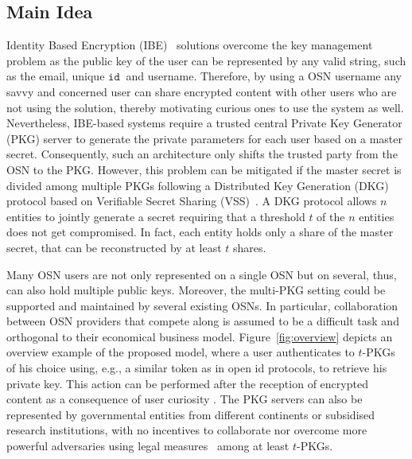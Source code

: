 \documentclass[journal]{IEEEtran}
\newcommand{\figref}[1]{{Figure}~\ref{#1}}
\newcommand{\id}[1]{\ensuremath{\mathtt{id}_{#1}}}
\begin{document}
\subsection{Main Idea}

Identity Based Encryption (IBE)~\cite{DBLP:conf/crypto/Shamir84} solutions overcome the key management problem as the public key of the user can be represented by any valid string, such as the email, unique \id{}\ and username. Therefore, by using a OSN username any savvy and concerned user can share encrypted content with other users who are not using the solution, thereby motivating curious ones to use the system as well. Nevertheless, IBE-based systems require a trusted central Private Key Generator (PKG) server to generate the private parameters for each user based on a master secret. Consequently, such an architecture only shifts the trusted party from the OSN to the PKG. However, this problem can be mitigated if the master secret is divided among multiple PKGs following a Distributed Key Generation (DKG)~\cite{Pedersen:1991:NIS:646756.705507} protocol based on Verifiable Secret Sharing (VSS)~\cite{DBLP:conf/focs/ChorGMA85}. A DKG protocol allows $n$ entities to jointly generate a secret requiring that a threshold $t$ of the $n$ entities does not get compromised. In fact, each entity holds only a share of the master secret, that can be reconstructed by at least $t$ shares. 

Many OSN users are not only represented on a single OSN but on several, thus, can also hold multiple public keys. Moreover, the multi-PKG setting could be supported and maintained by several existing OSNs. In particular, collaboration between OSN providers that compete along is assumed to be a difficult task and orthogonal to their economical business model. 
\figref{fig:overview} depicts an overview example of the proposed model, where a user authenticates to $t$-PKGs of his choice using, e.g., a similar token as in open id protocols, to retrieve his private key. This action can be performed after the reception of encrypted content as a consequence of user curiosity .
The PKG servers can also be represented by governmental entities from different continents or subsidised research institutions, with no incentives to collaborate nor overcome more powerful adversaries using legal measures~\cite{facebook-subpoena} among at least $t$-PKGs. 
\end{document}
